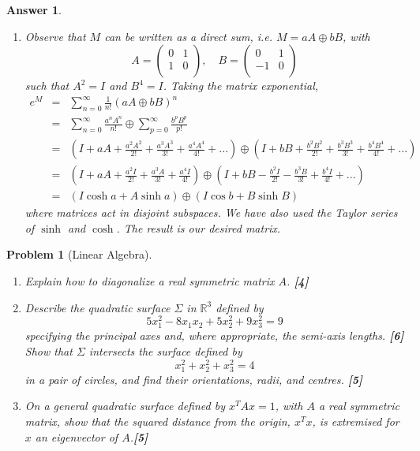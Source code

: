 \documentclass[a4paper]{article}
\newtheorem{ans}{Answer}[section]
\theoremstyle{new}
\newtheorem{qns}{Problem}[section]
\begin{document}
\begin{ans}
\begin{enumerate}[label=(\alph*)]
as well as
\begin{eqnarray}
e^{\epsilon X+\epsilon Y+\frac{1}{2}\epsilon^2[X,Y]+O(\epsilon^3)}&=&I+\epsilon X+\epsilon Y+\frac{1}{2}\epsilon^2(XY-YX)+O(\epsilon^3)+\frac{1}{2}(\epsilon X+\epsilon Y+O(\epsilon^3))^2+O(\epsilon^3)\nonumber\\&=&I+\epsilon(X+Y)+\frac{1}{2}(\epsilon^2(XY-YX)+\frac{1}{2}\epsilon^2(X^2+Y^2+XY+YX)+O(\epsilon^3)\nonumber\\&=&I+\epsilon(X+Y)+\epsilon^2(XY+\frac{1}{2}X^2+\frac{1}{2}Y^2)+O(\epsilon^3)\nonumber
\end{eqnarray}
\item Observe that $M$ can be written as a direct sum, i.e. $M=aA\oplus bB$, with
$$A=\begin{pmatrix}0&1\\1&0\\\end{pmatrix},\quad B=\begin{pmatrix}0&1\\-1&0\\\end{pmatrix}$$
such that $A^2=I$ and $B^4=I$. Taking the matrix exponential,
\begin{eqnarray}
e^M&=&\sum_{n=0}^\infty\frac{1}{n!}(aA\oplus bB)^n\nonumber\\&=&\sum_{n=0}^\infty\frac{a^nA^n}{n!}\oplus\sum_{p=0}^\infty\frac{b^pB^p}{p!}\nonumber\\&=& (I+aA+\frac{a^2A^2}{2!}+\frac{a^3A^3}{3!}+\frac{a^4A^4}{4!}+...)\oplus(I+bB+\frac{b^2B^2}{2!}+\frac{b^3B^3}{3!}+\frac{b^4B^4}{4!}+...)\nonumber\\&=&(I+aA+\frac{a^2I}{2!}+\frac{a^3A}{3!}+\frac{a^4I}{4!})\oplus(I+bB-\frac{b^2I}{2!}-\frac{b^3B}{3!}+\frac{b^4I}{4!}+...)\nonumber\\&=&(I\cosh a+ A\sinh a)\oplus(I\cos b+B\sinh B)\nonumber
\end{eqnarray}
where matrices act in disjoint subspaces. We have also used the Taylor series of $\sinh$ and $\cosh$. The result is our desired matrix.
\end{enumerate}
\end{ans}
\newpage
\begin{qns}[Linear Algebra]\leavevmode
\begin{enumerate}[label=(\alph*)]
\item Explain how to diagonalize a real symmetric matrix $A$. \hfill \textbf{[4]}
\item Describe the quadratic surface $\Sigma$ in $\mathbb{R}^3$ defined by
$$5x_1^2-8x_1x_2+5x_2^2+9x_3^2=9$$
specifying the principal axes and, where appropriate, the semi-axis lengths. \hfill \textbf{[6]}\\[5pt]
Show that $\Sigma$ intersects the surface defined by
$$x_1^2+x_2^2+x_3^2=4$$
in a pair of circles, and find their orientations, radii, and centres. \hfill \textbf{[5]}
\item On a general quadratic surface defined by $x^TAx = 1$, with $A$ a real symmetric matrix, show that the squared distance from the origin, $x^Tx$, is extremised for $x$ an eigenvector of $A$.\hfill \textbf{[5]}
\end{enumerate}
\end{qns}
\end{document}
